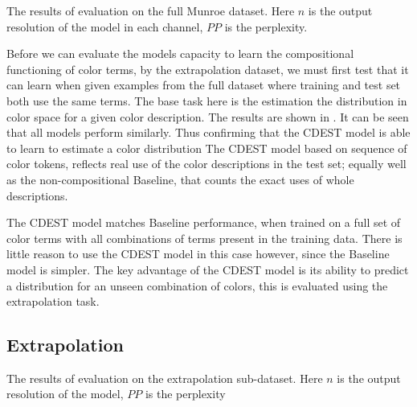 \documentclass[11pt,letterpaper, twocolumn]{article}
\begin{document}
\begin{table}
	\centering
	\caption{\label{tblresfull} The results of evaluation on the full Munroe  dataset. Here $n$ is the output resolution of the model in each channel, $PP$ is the perplexity.}
\end{table}

Before we can evaluate the models capacity to learn the compositional functioning of color terms, by the extrapolation dataset, we must first test that it can learn when given examples from the full dataset where training and test set both use the same terms.
The base task here is the estimation the distribution in color space for a given color description.
The results are shown in .
It can be seen that all models perform similarly.
Thus confirming that the CDEST model is able to learn to estimate a color distribution
The CDEST model based on sequence of color tokens,
reflects real use of the color descriptions in the test set; 
equally well as the non-compositional Baseline, that counts the exact uses of whole descriptions.

The CDEST model matches Baseline performance, when trained on a full set of color terms with all combinations of terms present in the training data.
There is little reason to use the CDEST model in this case however, since the Baseline model is simpler.
The key advantage of the CDEST model is its ability to predict a distribution for an unseen combination of colors, this is evaluated using the extrapolation task.

\subsection{Extrapolation}

\begin{table}
	\centering
	\caption{\label{tblresextrapo} The results of evaluation on the extrapolation sub-dataset. Here $n$ is the output resolution of the model, $PP$ is the perplexity}
\end{table}
\end{document}
